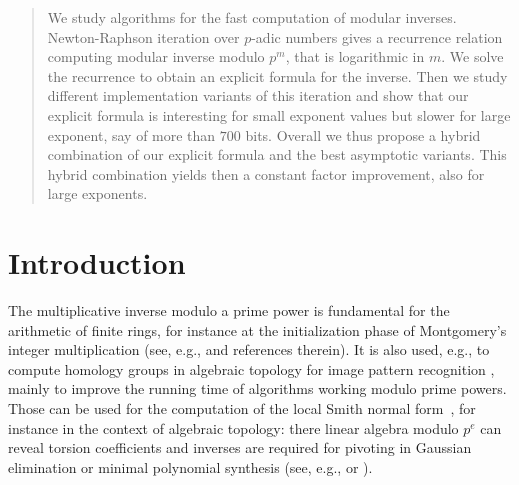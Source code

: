 \maketitle
\renewcommand{\algorithmicrequire}{{\textbf{Input:}}}
\renewcommand{\algorithmicensure}{{\textbf{Output:}}}
\makeatletter
\newcommand{\IFTHEN}[3][default]{\ALC@it\algorithmicif\ #2\
  \algorithmicthen\ #3\
  \ifthenelse{\boolean{ALC@noend}}{}{\algorithmicendif\ } \ALC@com{#1}}
\makeatother
\newcommand{\bigO}[1]{\ensuremath{\mathcal{O}\left(#1\right)}\xspace}
\newcommand{\LOGAND}{~\&\,}
\newcommand{\LOGANDIN}{~\&=\,}
\newcommand{\LOGORIN}{~|=\,}
\newcommand{\MULIN}{~*=\,}
\newcommand{\MOD}{~\%\,}
\newcommand{\MODIN}{~\%=\,}
\newcommand{\SUBIN}{~-=\,}
\newcommand{\ADDIN}{~+=\,}


\begin{abstract} 
  We study algorithms for the fast computation of modular inverses.
  Newton-Raphson iteration over $p$-adic numbers gives a recurrence relation computing modular inverse modulo $p^m$, that is logarithmic in $m$. 
  We solve the recurrence to obtain an explicit formula for the inverse. 
  Then we study different implementation variants of this iteration and show that our explicit formula is interesting for small exponent values but slower for large exponent, say of more than $700$ bits.
  Overall we thus propose a hybrid combination of our explicit formula and the best asymptotic variants. This hybrid combination yields then a constant factor improvement, also for large exponents. 
\end{abstract}
\section{Introduction}
The multiplicative inverse modulo a prime power is fundamental for the
arithmetic of finite rings, for instance at the initialization phase of
Montgomery's integer multiplication (see, e.g.,
\cite{Dusse:1990:eurocrypt,Arazi:2008:CMI} and references therein). 
It is also used, e.g., to compute homology groups in algebraic topology for
image pattern recognition \cite{jgd:2003:GAP}, mainly to improve the running
time of algorithms working modulo prime powers. Those can be used for the
computation of the local Smith normal
form~\cite{jgd:2001:JSC,Elsheikh:2012:ISSAC}, for instance in the context of
algebraic topology: there linear algebra
modulo $p^e$ can reveal torsion coefficients and inverses are required for
pivoting in Gaussian elimination or minimal polynomial synthesis (see, e.g.,
\cite[algorithm LRE]{jgd:2003:GAP} or \cite{Reeds:1985:SRS}). 


